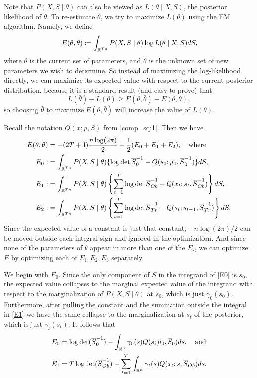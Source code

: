 \documentclass[12pt,leqno]{article}
\begin{document}
Note that $P(X,S\mid\theta)$ can also be viewed as  $L(\theta\mid X,S)$, the posterior likelihood of $\theta$.
To re-estimate $\theta$, we try to maximize $L(\theta)$ using the EM algorithm. Namely, we define 
$$
E(\theta,\bar{\theta}) := \int_{{\mathbb R}^{Tn}}P(X,S\mid\theta)\log{L(\bar{\theta}\mid X,S)}dS,
$$
where $\theta$ is the current set of parameters, and $\bar{\theta}$ is the unknown set of new parameters
we wish to determine. So instead of maximizing the log-likelihood directly, we can maximize its expected
value with respect to the current posterior distribution, because it is a standard result (and easy to prove) that
$$
L(\bar{\theta}) - L(\theta) \ge E(\theta,\bar{\theta}) - E(\theta,\theta),
$$
so choosing $\bar{\theta}$ to maximize $E(\theta,\bar{\theta})$ will increase the value of $L(\theta)$.


  
Recall the notation $Q(x;\mu,S)$ from \eqref{comp_sq:1}.  Then we have
\begin{align}
  E(\theta,\bar{\theta}) &= -(2T+1)\frac{n\log(2\pi)}{2} + \frac{1}{2}(E_0 + E_1 + E_2),\quad\text{where}\notag\\
  E_0 :&=\int_{{\mathbb R}^{Tn}}P(X,S\mid\theta)\{\log\det\overline{S}^{-1}_0 - Q(s_0;\bar{\mu}_0,\overline{S}_0^{-1})\}dS,\label{E0}\\
  E_1 :&= \int_{{\mathbb R}^{Tn}}P(X,S\mid\theta)\left\{\sum_{t=1}^T\log\det\overline{S}^{-1}_{Ob} - Q(x_t;s_t,\overline{S}_{Ob}^{-1})\right\}dS,
\label{E1}\\
  E_2 :&= \int_{{\mathbb R}^{Tn}}P(X,S\mid\theta)\left\{\sum_{t=1}^T\log\det\overline{S}^{-1}_{Tr} - Q(s_t;s_{t-1},\overline{S}_{Tr}^{-1})\right\}dS,
\label{E2}
\end{align}
Since the expected value of a constant is just that constant, $-n\log(2\pi)/2$ can be moved outside each
integral sign and ignored in the optimization.  And since none of the parameters of $\theta$ appear in more
than one of the $E_i$, we can optimize $E$ by optimizing each of $E_1,E_2,E_3$ separately.

We begin with $E_0$. Since the only component of $S$ in the integrand of \eqref{E0} is $s_0$, the expected value
collapses to the marginal 
expected value of the integrand with respect to the marginalization of $P(X,S\mid\theta)$ at $s_0$, which is just 
$\gamma_0(s_0)$.  Furthermore, after pulling the constant and the summation 
outside the integral in \eqref{E1} we have the same collapse to the marginalization at $s_t$ of the posterior, which
is just $\gamma_t(s_t)$.  It follows that
\begin{align*}
E_0 &= \log\det(\overline{S}^{-1}_0) - \int_{{\mathbb R}^n}\gamma_0(s)Q(s;\bar{\mu}_0,\overline{S}_0)ds,\quad\text{and}\\
E_1 &= T\log\det(\overline{S}^{-1}_{Ob}) - \sum_{t=1}^T\int_{{\mathbb R}^n}\gamma_t(s)Q(x_t;s,\overline{S}_{Ob})ds.
\end{align*}
\end{document}
